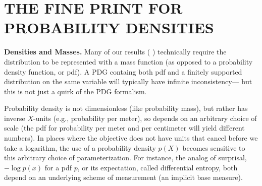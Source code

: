 \documentclass[twoside]{article}
\theoremstyle{plain}
\newtheorem{remark}{Remark}
\theoremstyle{definition}
\begin{document}
\section{THE FINE PRINT FOR PROBABILITY DENSITIES}
\label{appendix:density}
\textbf{Densities and Masses.} Many of our results (%
)
technically require the distribution to be represented with a mass function (as opposed to a probability density function, or pdf).
A PDG containg both pdf and a finitely supported distribution on the same variable
will typically have infinite inconsistency---%
but this is not just a quirk of the PDG formalism.


Probability density is not dimensionless (like probability mass), but rather has inverse $X$-units (e.g., probability per meter), so depends on an arbitrary choice of scale (the pdf for probability per meter and per centimeter will yield different numbers).
In places where the objective does not have units that cancel before we take a logarithm,
the use of a probability density $p(X)$ becomes sensitive to this arbitrary choice of parameterization. For instance, the analog of surprisal, $- \log p(x)$ for a pdf $p$, or its expectation, called differential entropy, both depend on an underlying scheme of measurement (an implicit base measure).
%
\end{document}
